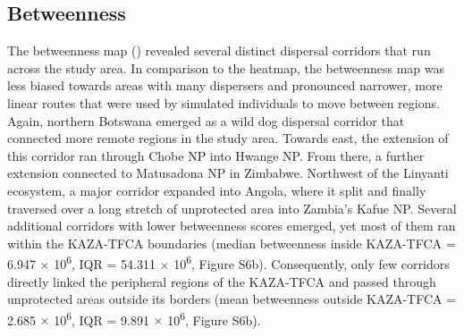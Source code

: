 \documentclass[abstract=on,10pt,a4paper,bibliography=totocnumbered]{article}
\begin{document}
\subsection{Betweenness}
The betweenness map () revealed several distinct dispersal
corridors that run across the study area. In comparison to the heatmap, the
betweenness map was less biased towards areas with many dispersers and
pronounced narrower, more linear routes that were used by simulated individuals
to move between regions. Again, northern Botswana emerged as a wild dog
dispersal corridor that connected more remote regions in the study area. Towards
east, the extension of this corridor ran through Chobe NP into Hwange NP. From
there, a further extension connected to Matusadona NP in Zimbabwe. Northwest of
the Linyanti ecosystem, a major corridor expanded into Angola, where it split
and finally traversed over a long stretch of unprotected area into Zambia's
Kafue NP. Several additional corridors with lower betweenness scores emerged,
yet most of them ran within the KAZA-TFCA boundaries (median betweenness inside
KAZA-TFCA = 6.947 \(\times\) 10\textsuperscript{6}, IQR = 54.311 \(\times\)
10\textsuperscript{6}, Figure S6b). Consequently, only few corridors directly
linked the peripheral regions of the KAZA-TFCA and passed through unprotected
areas outside its borders (mean betweenness outside KAZA-TFCA = 2.685 \(\times\)
10\textsuperscript{6}, IQR = 9.891 \(\times\) 10\textsuperscript{6}, Figure
S6b).

\end{document}
